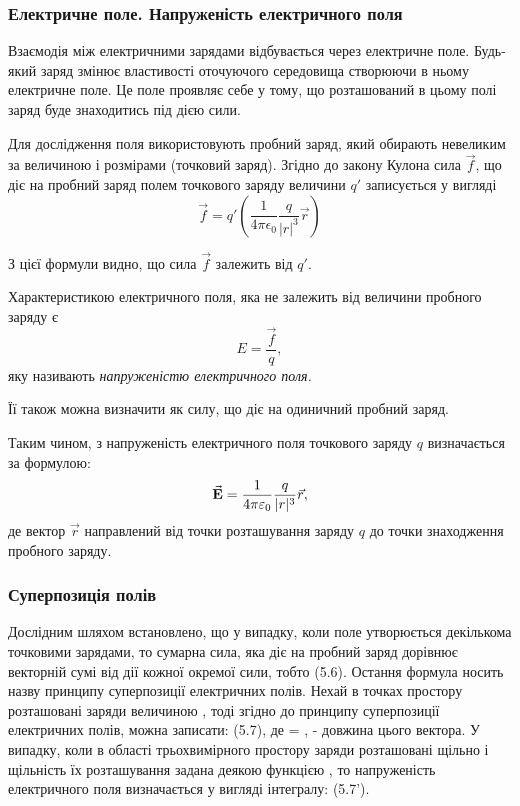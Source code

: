\subsubsection{Електричне поле. Напруженість електричного поля}

Взаємодія між електричними зарядами відбувається через електричне поле. Будь-який заряд змінює властивості оточуючого середовища створюючи в ньому електричне поле. Це поле проявляє себе у тому, що розташований в цьому полі заряд буде знаходитись під дією сили. \medskip

Для дослідження поля використовують пробний заряд, який обирають невеликим за величиною і розмірами (точковий заряд). Згідно до закону Кулона сила $\vec f$, що діє на пробний заряд   полем точкового заряду величини $q'$ записується у вигляді
\begin{equation}
	\vec f = q' \left( \frac{1}{4 \pi \epsilon_0} \frac{q}{|r|^3} \vec r \right)
\end{equation}

З цієї формули видно, що сила $\vec f$ залежить від $q'$.

\begin{definition}
	Характеристикою електричного поля, яка не залежить від величини пробного заряду є
	\begin{equation}
		E = \frac{\vec f}{q},
	\end{equation}
	яку називають \it{напруженістю електричного поля}.
\end{definition}

\begin{remark}
	Її також можна визначити як силу, що діє на одиничний пробний заряд.
\end{remark}

Таким чином, з напруженість електричного поля точкового заряду $q$ визначається за формулою:
\begin{equation}
	{\vec{\mathbf{E}}} = \frac{1}{4 \pi \varepsilon_0} \frac{q}{|r|^3} \vec r,
\end{equation}
де вектор $\vec r$ направлений від точки розташування заряду $q$ до точки знаходження пробного заряду. 

\subsubsection{Суперпозиція полів}

Дослідним шляхом встановлено, що у випадку, коли поле утворюється декількома точковими зарядами, то сумарна сила, яка діє на пробний заряд дорівнює векторній сумі від дії кожної окремої сили, тобто  
 									(5.6).
Остання формула носить назву принципу суперпозиції електричних полів.
Нехай в точках   простору розташовані заряди величиною    , тоді згідно до принципу суперпозиції електричних полів, можна записати:
 								(5.7),
де   = ,   - довжина цього вектора. 
У випадку, коли в області   трьохвимірного простору заряди розташовані щільно і щільність їх розташування задана деякою функцією  , то напруженість електричного поля визначається у вигляді інтегралу:
  							(5.7').

